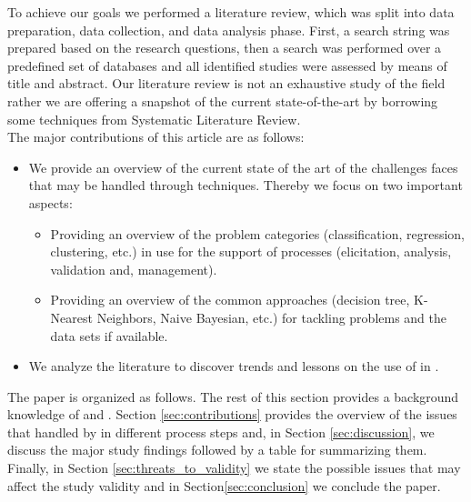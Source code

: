 To achieve our goals we performed a literature review, which was split into data preparation, data collection, and data analysis phase. First, a search string was prepared based on the research questions, then a search was performed over a predefined set of databases and all identified studies were assessed by means of title and abstract. Our literature review is not an exhaustive study of the field rather we are offering a snapshot of the current state-of-the-art by borrowing some techniques from Systematic Literature Review.\\
The major contributions of this article are as follows:
\begin{itemize}
    \item We provide an overview of the current state of the art of the challenges \RE faces that may be handled through \ML techniques. Thereby we focus on two important aspects:
    \begin{itemize}
        \item Providing an overview of the \ML problem categories (classification, regression, clustering, etc.) in use for the support of \RE processes (elicitation, analysis, validation and, management).
        \item Providing an overview of the common \ML approaches (decision tree, K-Nearest Neighbors, Naive Bayesian, etc.) for tackling \RE problems and the data sets if available. 
    \end{itemize}
    \item We analyze the literature to discover trends and lessons on the use of \ML in \RE.
\end{itemize}
The paper is organized as follows. The rest of this section provides a background knowledge of \ML and \RE. Section \ref{sec:contributions} provides the overview of the issues that handled by \ML in different \RE process steps and, in Section \ref{sec:discussion}, we discuss the major study findings followed by a table for summarizing them. Finally, in Section \ref{sec:threats_to_validity} we state the possible issues that may affect the study validity and in Section\ref{sec:conclusion} we conclude the paper.


